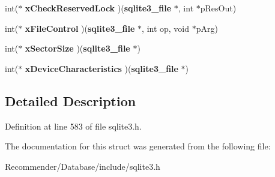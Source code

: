 \begin{CompactItemize}
\item 
int($\ast$ \textbf{xCheckReservedLock} )({\bf sqlite3\_\-file} $\ast$, int $\ast$pResOut)\label{structsqlite3__io__methods_5eb19302e4f81de062ae2f589d3c5955}

\item 
int($\ast$ \textbf{xFileControl} )({\bf sqlite3\_\-file} $\ast$, int op, void $\ast$pArg)\label{structsqlite3__io__methods_6ef23eda890920cc3fe586fc9ef1f7b1}

\item 
int($\ast$ \textbf{xSectorSize} )({\bf sqlite3\_\-file} $\ast$)\label{structsqlite3__io__methods_355a7a9ee3b728f7c3976130d24774bd}

\item 
int($\ast$ \textbf{xDeviceCharacteristics} )({\bf sqlite3\_\-file} $\ast$)\label{structsqlite3__io__methods_224cdced99e3c80391ccf1ffab06562f}

\end{CompactItemize}


\subsection{Detailed Description}




Definition at line 583 of file sqlite3.h.

The documentation for this struct was generated from the following file:\begin{CompactItemize}
\item 
Recommender/Database/include/sqlite3.h\end{CompactItemize}
